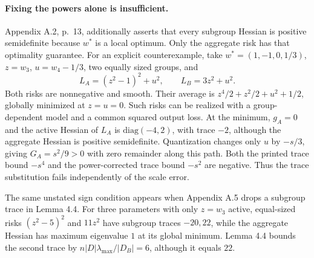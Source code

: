 \documentclass[10pt]{article}
\begin{document}
\paragraph*{Fixing the powers alone is insufficient.}\mbox{}\par
Appendix A.2, p. 13, additionally asserts that every subgroup Hessian is positive semidefinite because \(w^*\) is a local optimum. Only the aggregate risk has that optimality guarantee. For an explicit counterexample, take \(w^*=(1,-1,0,1/3)\), \(z=w_3\), \(u=w_4-1/3\), two equally sized groups, and \[L_A=(z^2-1)^2+u^2,\qquad L_B=3z^2+u^2.\] Both risks are nonnegative and smooth. Their average is \(z^4/2+z^2/2+u^2+1/2\), globally minimized at \(z=u=0\). Such risks can be realized with a group-dependent model and a common squared output loss. At the minimum, \(g_A=0\) and the active Hessian of \(L_A\) is \(\mathrm{diag}(-4,2)\), with trace \(-2\), although the aggregate Hessian is positive semidefinite. Quantization changes only \(u\) by \(-s/3\), giving \(G_A=s^2/9>0\) with zero remainder along this path. Both the printed trace bound \(-s^4\) and the power-corrected trace bound \(-s^2\) are negative. Thus the trace substitution fails independently of the scale error.\par
The same unstated sign condition appears when Appendix A.5 drops a subgroup trace in Lemma 4.4. For three parameters with only \(z=w_3\) active, equal-sized risks \((z^2-5)^2\) and \(11z^2\) have subgroup traces \(-20,22\), while the aggregate Hessian has maximum eigenvalue \(1\) at its global minimum. Lemma 4.4 bounds the second trace by \(n|D|\lambda_{\max}/|D_B|=6\), although it equals \(22\).\par
\end{document}
